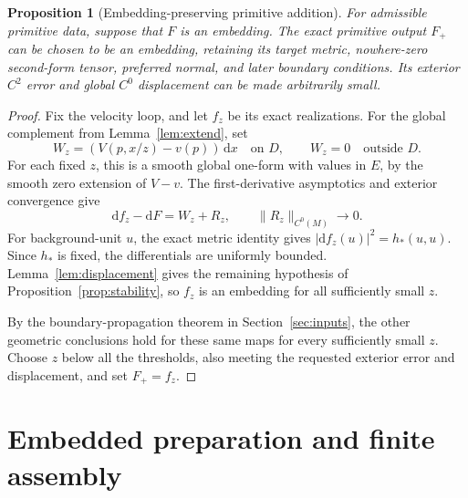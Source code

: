 \documentclass[11pt,a4paper]{article}
\newcommand{\dd}{\mathrm d}
\newtheorem{proposition}[theorem]{Proposition}
\theoremstyle{definition}
\theoremstyle{remark}
\numberwithin{equation}{section}
\begin{document}
\begin{proposition}[Embedding-preserving primitive addition]
\label{prop:primitive}
For admissible primitive data, suppose that $F$ is an embedding.
The exact primitive output $F_+$ can be chosen to be an embedding,
retaining its target metric,
nowhere-zero second-form tensor, preferred normal, and later boundary
conditions. Its exterior $C^2$ error and global $C^0$ displacement
can be made arbitrarily small.
\end{proposition}
\begin{proof}
Fix the velocity loop, and let $f_z$ be its exact realizations. For the global
complement from Lemma~\ref{lem:extend}, set
\[
 W_z=(V(p,x/z)-v(p))\,\dd x\quad\text{on }D,
 \qquad W_z=0\quad\text{outside }D.
\]
For each fixed $z$, this is a smooth global one-form with values in $E$,
by the smooth zero extension of $V-v$. The first-derivative asymptotics
and exterior convergence give
\[
 \dd f_z-\dd F=W_z+R_z,\qquad \|R_z\|_{C^0(M)}\to0.
\]
For background-unit $u$, the exact metric identity gives
$|\dd f_z(u)|^2=h_*(u,u)$. Since $h_*$ is fixed, the differentials
are uniformly bounded. Lemma~\ref{lem:displacement} gives the remaining
hypothesis of Proposition~\ref{prop:stability}, so $f_z$ is an embedding
for all sufficiently small $z$.

By the boundary-propagation theorem in Section~\ref{sec:inputs}, the other
geometric conclusions hold for these same maps for every sufficiently small
$z$. Choose $z$ below all the thresholds, also meeting the requested
exterior error and displacement, and set $F_+=f_z$.
\end{proof}

\section{Embedded preparation and finite assembly}
\label{sec:global}
\end{document}
